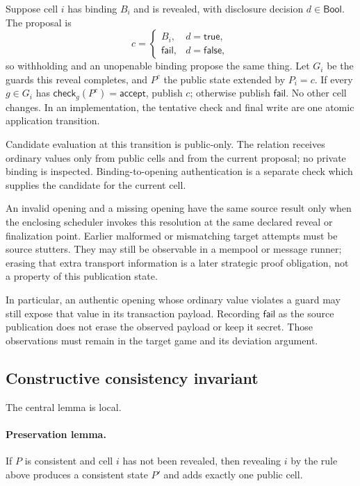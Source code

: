 \documentclass[11pt]{article}
\newcommand{\Failed}{\mathsf{fail}}
\newcommand{\Sat}{\mathsf{accept}}
\begin{document}
Suppose cell $i$ has binding $B_i$ and is revealed, with disclosure decision
$d\in\mathsf{Bool}$.  The proposal is
\[
 c =
 \begin{cases}
   B_i,&d=\mathsf{true},\\
   \Failed,&d=\mathsf{false},
 \end{cases}
\]
so withholding and an unopenable binding propose the same thing.  Let $G_i$ be
the guards this reveal completes, and $P^{c}$ the public state extended by
$P_i=c$.  If every $g\in G_i$ has $\mathsf{check}_g(P^c)=\Sat$, publish $c$;
otherwise publish $\Failed$.  No other cell changes.  In an implementation, the
tentative check and final write are one atomic application transition.

Candidate evaluation at this transition is public-only.  The relation receives
ordinary values only from public cells and from the current proposal; no
private binding is inspected.  Binding-to-opening authentication is a separate
check which supplies the candidate for the current cell.

An invalid opening and a missing opening have the same source result only when
the enclosing scheduler invokes this resolution at the same declared reveal or
finalization point.  Earlier malformed or mismatching target attempts must be
source stutters.  They may still be observable in a mempool or message runner;
erasing that extra transport information is a later strategic proof obligation,
not a property of this publication state.

In particular, an authentic opening whose ordinary value violates a guard may
still expose that value in its transaction payload. Recording $\Failed$ as the
source publication does not erase the observed payload or keep it secret.
Those observations must remain in the target game and its deviation argument.

\subsection{Constructive consistency invariant}
\label{sec:invariant}

The central lemma is local.

\paragraph{Preservation lemma.}
If $P$ is consistent and cell $i$ has not been revealed, then revealing $i$ by
the rule above produces a consistent state $P'$ and adds exactly one public
cell.
\end{document}
